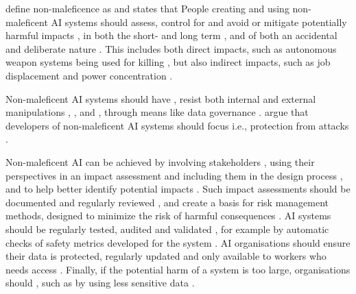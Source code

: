 \textcite[p.~6]{Doorn_2021} define non-maleficence as  and states that  People creating and using non-maleficent AI systems should assess, control for and avoid or mitigate potentially harmful impacts \parencites{Buhmann_2021,Fjeld_2020}, in both the short- and long term \parencite[p.~416]{Clarke_2019}, and of both an accidental and deliberate nature \parencite[p.~697]{Floridi_2018}. This includes both direct impacts, such as autonomous weapon systems being used for killing \parencite{Eitel-Porter_2021}, but also indirect impacts, such as job displacement \parencite[p.~12]{Gupta_2021} and power concentration \parencite{Jobin_2019}.

Non-maleficent AI systems should have  \parencite[p.~416]{Clarke_2019}, resist both internal and external manipulations \parencite{Fjeld_2020,Rothenberger_2019},  \parencite[p.~13]{Jobin_2019}, and  \parencite[p.~2]{Buhmann_2021}, through means like data governance \parencite{Werder_2022}. \textcite[p.~13]{Anagnostou_2022} argue that developers of non-maleficent AI systems should focus  i.e., protection from attacks \parencite[p.~70]{Ryan_2021}. 

Non-maleficent AI can be achieved by involving stakeholders \parencite{Jobin_2019,Dignum_2021}, using their perspectives in an impact assessment and including them in the design process \parencite[p.~416]{Clarke_2019}, and to help better identify potential impacts \parencite{Havrda_2020}. Such impact assessments should be documented and regularly reviewed \parencite[p.~70]{Ryan_2021}, and create a basis for risk management methods, designed to minimize the risk of harmful consequences \parencite{Buhmann_2021,Clarke_2019,Brand_2022}. AI systems should be regularly tested, audited and validated \parencite{Jobin_2019,Fjeld_2020,vanBruxvoort_2021}, for example by automatic checks of safety metrics developed for the system  \parencite{Havrda_2020}. AI organisations should ensure their data is protected, regularly updated and only available to workers who needs access \parencite{vanBruxvoort_2021,Mikalef_2022}. Finally, if the potential harm of a system is too large, organisations should  \parencite[p.~419]{Clarke_2019}, such as by using less sensitive data \parencite[p.~10]{vanBruxvoort_2021}.


